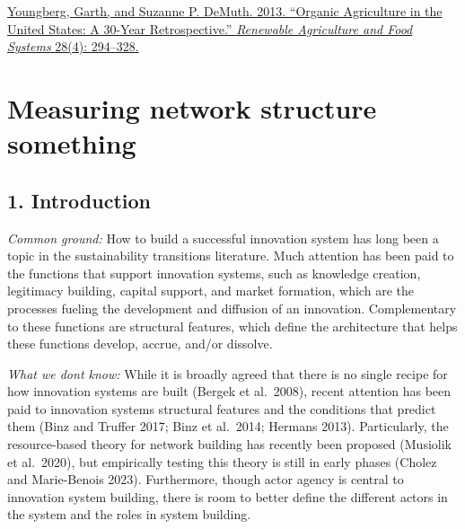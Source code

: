 \documentclass[twoside,12pt,final]{ucthesis-CA2012}
\begin{document}
\begin{ucmainmatter}
\href{https://www.zotero.org/google-docs/?hv36Bh}{Youngberg, Garth, and Suzanne P. DeMuth. 2013. ``Organic Agriculture in
the United States: A 30-Year Retrospective.'' \emph{Renewable Agriculture and
Food Systems} 28(4):
294--328.}

\hypertarget{measuring-network-structure-something}{%
\chapter{Measuring network structure something}\label{measuring-network-structure-something}}


\hypertarget{introduction-3}{%
\section{1. Introduction}\label{introduction-3}}

\emph{Common ground:} How to build a successful innovation system has long
been a topic in the sustainability transitions literature. Much
attention has been paid to the functions that support innovation
systems, such as knowledge creation, legitimacy building, capital
support, and market formation, which are the processes fueling the
development and diffusion of an innovation. Complementary to these
functions are structural features, which define the architecture that
helps these functions develop, accrue, and/or dissolve.

\emph{What we don\textquotesingle t know:} While it is broadly agreed that there is no
single recipe for how innovation systems are built (Bergek et al.~2008),
recent attention has been paid to innovation systems\textquotesingle{} structural
features and the conditions that predict them (Binz and Truffer 2017;
Binz et al.~2014; Hermans 2013). Particularly, the resource-based theory
for network building has recently been proposed (Musiolik et al.~2020),
but empirically testing this theory is still in early phases (Cholez and
Marie-Benois 2023). Furthermore, though actor agency is central to
innovation system building, there is room to better define the different
actors in the system and the roles in system building.


\end{ucmainmatter}
\end{document}
